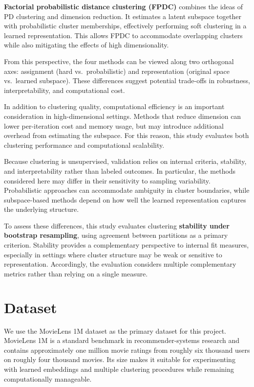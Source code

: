 \documentclass[
  11pt,
]{article}
\begin{document}
\textbf{Factorial probabilistic distance clustering (FPDC)} combines the
ideas of PD clustering and dimension reduction. It estimates a latent
subspace together with probabilistic cluster memberships, effectively
performing soft clustering in a learned representation. This allows FPDC
to accommodate overlapping clusters while also mitigating the effects of
high dimensionality.

From this perspective, the four methods can be viewed along two
orthogonal axes: assignment (hard vs.~probabilistic) and representation
(original space vs.~learned subspace). These differences suggest
potential trade-offs in robustness, interpretability, and computational
cost.

In addition to clustering quality, computational efficiency is an
important consideration in high-dimensional settings. Methods that
reduce dimension can lower per-iteration cost and memory usage, but may
introduce additional overhead from estimating the subspace. For this
reason, this study evaluates both clustering performance and
computational scalability.

Because clustering is unsupervised, validation relies on internal
criteria, stability, and interpretability rather than labeled outcomes.
In particular, the methods considered here may differ in their
sensitivity to sampling variability. Probabilistic approaches can
accommodate ambiguity in cluster boundaries, while subspace-based
methods depend on how well the learned representation captures the
underlying structure.

To assess these differences, this study evaluates clustering
\textbf{stability under bootstrap resampling}, using agreement between
partitions as a primary criterion. Stability provides a complementary
perspective to internal fit measures, especially in settings where
cluster structure may be weak or sensitive to representation.
Accordingly, the evaluation considers multiple complementary metrics
rather than relying on a single measure.

\section{Dataset}\label{dataset}

We use the MovieLens 1M dataset as the primary dataset for this project.
MovieLens 1M is a standard benchmark in recommender-systems research and
contains approximately one million movie ratings from roughly six
thousand users on roughly four thousand movies. Its size makes it
suitable for experimenting with learned embeddings and multiple
clustering procedures while remaining computationally manageable.
\end{document}
